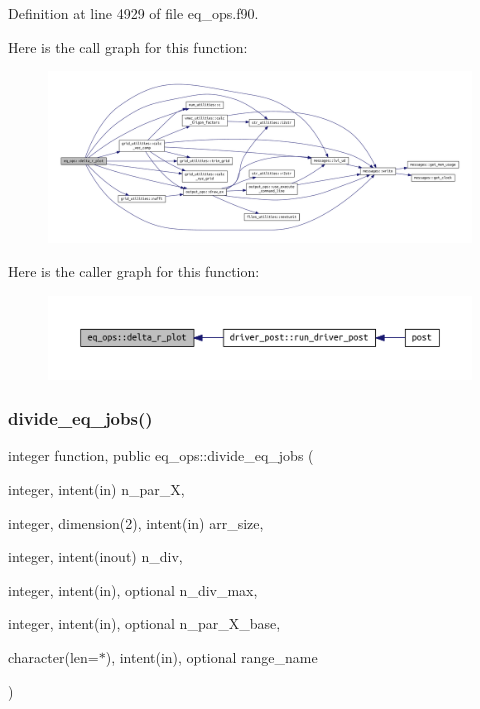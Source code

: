 Definition at line 4929 of file eq\+\_\+ops.\+f90.

Here is the call graph for this function\+:\nopagebreak
\begin{figure}[H]
\begin{center}
\leavevmode
\includegraphics[width=350pt]{namespaceeq__ops_ac0a79893900631d25b170be0abd2c131_cgraph}
\end{center}
\end{figure}
Here is the caller graph for this function\+:\nopagebreak
\begin{figure}[H]
\begin{center}
\leavevmode
\includegraphics[width=350pt]{namespaceeq__ops_ac0a79893900631d25b170be0abd2c131_icgraph}
\end{center}
\end{figure}
\mbox{\label{namespaceeq__ops_a8fae749abe55865d8135fef536a8e8f1}} 
\subsubsection{\texorpdfstring{divide\+\_\+eq\+\_\+jobs()}{divide\_eq\_jobs()}}
{\footnotesize\ttfamily integer function, public eq\+\_\+ops\+::divide\+\_\+eq\+\_\+jobs (\begin{DoxyParamCaption}\item[{integer, intent(in)}]{n\+\_\+par\+\_\+X,  }\item[{integer, dimension(2), intent(in)}]{arr\+\_\+size,  }\item[{integer, intent(inout)}]{n\+\_\+div,  }\item[{integer, intent(in), optional}]{n\+\_\+div\+\_\+max,  }\item[{integer, intent(in), optional}]{n\+\_\+par\+\_\+\+X\+\_\+base,  }\item[{character(len=$\ast$), intent(in), optional}]{range\+\_\+name }\end{DoxyParamCaption})}



